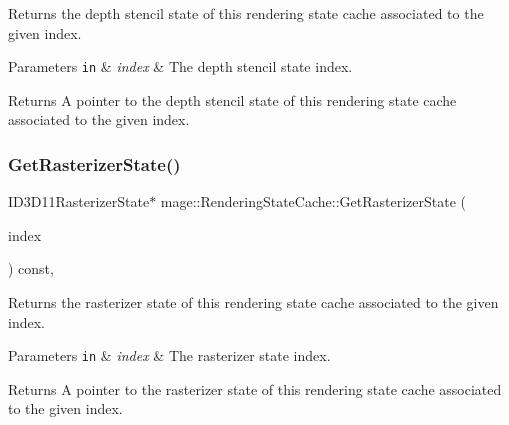 Returns the depth stencil state of this rendering state cache associated to the given index.


\begin{DoxyParams}[1]{Parameters}
\mbox{\tt in}  & {\em index} & The depth stencil state index. \\
\hline
\end{DoxyParams}
\begin{DoxyReturn}{Returns}
A pointer to the depth stencil state of this rendering state cache associated to the given index. 
\end{DoxyReturn}
\hypertarget{structmage_1_1_rendering_state_cache_aa4f5db677a2a0bfe3e209a2a30c48c2a}{}\label{structmage_1_1_rendering_state_cache_aa4f5db677a2a0bfe3e209a2a30c48c2a} 
\subsubsection{\texorpdfstring{Get\+Rasterizer\+State()}{GetRasterizerState()}}
{\footnotesize\ttfamily I\+D3\+D11\+Rasterizer\+State$\ast$ mage\+::\+Rendering\+State\+Cache\+::\+Get\+Rasterizer\+State (\begin{DoxyParamCaption}\item[{\hyperlink{structmage_1_1_rendering_state_cache_ab3cd83fde15cb9f0858e9617e32cd044}{Rasterizer\+State\+Index}}]{index }\end{DoxyParamCaption}) const\hspace{0.3cm}{\ttfamily [private]}, {\ttfamily [noexcept]}}

Returns the rasterizer state of this rendering state cache associated to the given index.


\begin{DoxyParams}[1]{Parameters}
\mbox{\tt in}  & {\em index} & The rasterizer state index. \\
\hline
\end{DoxyParams}
\begin{DoxyReturn}{Returns}
A pointer to the rasterizer state of this rendering state cache associated to the given index. 
\end{DoxyReturn}
\hypertarget{structmage_1_1_rendering_state_cache_a1ecea46f19f8ee868f1e976391d130ad}{}\label{structmage_1_1_rendering_state_cache_a1ecea46f19f8ee868f1e976391d130ad} 
